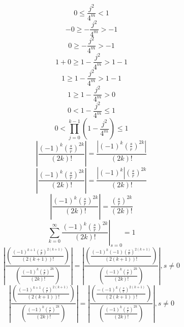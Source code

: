 \documentclass[a4paper,12pt]{report}
\begin{document}
\begin{equation}
0 \leq \frac{j^2}{4^m} < 1
\end{equation}
\begin{equation}
-0 \geq -\frac{j^2}{4^m} > -1
\end{equation}
\begin{equation}
0 \geq -\frac{j^2}{4^m} > -1
\end{equation}
\begin{equation}
1 + 0 \geq 1 - \frac{j^2}{4^m} > 1 - 1
\end{equation}
\begin{equation}
1 \geq 1 - \frac{j^2}{4^m} > 1 - 1
\end{equation}
\begin{equation}
1 \geq 1 - \frac{j^2}{4^m} > 0
\end{equation}
\begin{equation}
0 < 1 - \frac{j^2}{4^m} \leq 1
\end{equation}
\begin{equation}
0 < \prod \limits_{j=0}^{k-1} \left(1 - \frac{j^2}{4^m}\right) \leq 1
\end{equation}
\begin{equation}
\left|\frac{(-1)^k \left(\frac{s}{r}\right)^{2k}}{(2k)!}\right| = \frac{\left|(-1)^k \left(\frac{s}{r}\right)^{2k}\right|}{(2k)!}
\end{equation}
\begin{equation}
\left|\frac{(-1)^k \left(\frac{s}{r}\right)^{2k}}{(2k)!}\right| = \frac{\left|(-1)^k\right| \left(\frac{s}{r}\right)^{2k}}{(2k)!}
\end{equation}
\begin{equation}
\left|\frac{(-1)^k \left(\frac{s}{r}\right)^{2k}}{(2k)!}\right| = \frac{\left(\frac{s}{r}\right)^{2k}}{(2k)!}
\end{equation}
\begin{equation}
\left.\sum \limits_{k=0}^{\infty} \frac{(-1)^k \left(\frac{s}{r}\right)^{2k}}{(2k)!}\right|_{s=0} = 1
\end{equation}
\begin{equation}
\left|\frac{\left(\frac{(-1)^{k+1} \left(\frac{s}{r}\right)^{2(k+1)}}{(2(k+1))!}\right)}{\left(\frac{(-1)^k \left(\frac{s}{r}\right)^{2k}}{(2k)!}\right)}\right| = \left|\frac{\left(\frac{(-1)^k (-1) \left(\frac{s}{r}\right)^{2(k+1)}}{(2(k+1))!}\right)}{\left(\frac{(-1)^k \left(\frac{s}{r}\right)^{2k}}{(2k)!}\right)}\right|, s \neq 0
\end{equation}
\begin{equation}
\left|\frac{\left(\frac{(-1)^{k+1} \left(\frac{s}{r}\right)^{2(k+1)}}{(2(k+1))!}\right)}{\left(\frac{(-1)^k \left(\frac{s}{r}\right)^{2k}}{(2k)!}\right)}\right| = \left|\frac{\left(\frac{-(-1)^k \left(\frac{s}{r}\right)^{2(k+1)}}{(2(k+1))!}\right)}{\left(\frac{(-1)^k \left(\frac{s}{r}\right)^{2k}}{(2k)!}\right)}\right|, s \neq 0
\end{equation}
\end{document}
